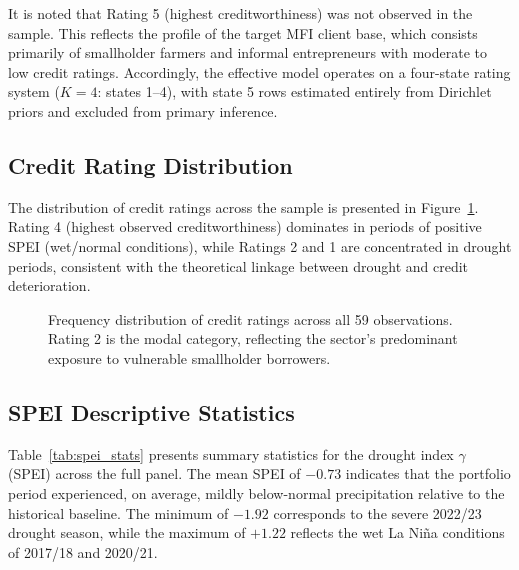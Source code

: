 \documentclass[12pt,a4paper]{article}
\begin{document}
It is noted that Rating 5 (highest creditworthiness) was not observed in the sample. This reflects the profile of the target MFI client base, which consists primarily of smallholder farmers and informal entrepreneurs with moderate to low credit ratings. Accordingly, the effective model operates on a four-state rating system ($K = 4$: states 1--4), with state 5 rows estimated entirely from Dirichlet priors and excluded from primary inference.

\subsection{Credit Rating Distribution}

The distribution of credit ratings across the sample is presented in Figure~\ref{fig:rating_dist}. Rating 4 (highest observed creditworthiness) dominates in periods of positive SPEI (wet/normal conditions), while Ratings 2 and 1 are concentrated in drought periods, consistent with the theoretical linkage between drought and credit deterioration.

\begin{figure}[H]
\centering
{}
\caption{Frequency distribution of credit ratings across all 59 observations. Rating 2 is the modal category, reflecting the sector's predominant exposure to vulnerable smallholder borrowers.}
\label{fig:rating_dist}
\end{figure}

\subsection{SPEI Descriptive Statistics}

Table~\ref{tab:spei_stats} presents summary statistics for the drought index $\gamma$ (SPEI) across the full panel. The mean SPEI of $-0.73$ indicates that the portfolio period experienced, on average, mildly below-normal precipitation relative to the historical baseline. The minimum of $-1.92$ corresponds to the severe 2022/23 drought season, while the maximum of $+1.22$ reflects the wet La Niña conditions of 2017/18 and 2020/21.
\end{document}
